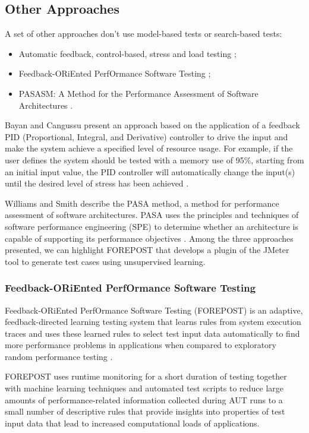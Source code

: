 \documentclass[espaco=umemeio,chapter=TITLE,twoside,openright]{abnt}
\begin{document}
\subsection{Other Approaches}

A set of other approaches don't use model-based tests or search-based tests:

\begin{itemize}
\item Automatic feedback, control-based, stress and load testing \cite{Bayan2008};
\item Feedback-ORiEnted PerfOrmance Software Testing \cite{Luo2015};
\item PASASM: A Method for the
Performance Assessment of Software Architectures \cite{Williams2002}.
\end{itemize}

Bayan and Cangussu present an approach based on the application of a feedback
PID (Proportional, Integral, and Derivative) controller to drive the input and make the system achieve a specified level of resource usage. For example, if the user defines the system should be tested with a memory use of 95\%, starting from an initial input value, the PID controller will automatically change the input(s) until the desired level of stress has been achieved \cite{Bayan2008}.

Williams and Smith describe the PASA method, a method for performance assessment of software architectures. PASA uses the principles and techniques of software performance engineering (SPE) to determine whether an architecture is capable of supporting its performance objectives  \cite{Williams2002}. Among the three approaches presented, we can highlight FOREPOST that develops a plugin of the JMeter tool to generate test cases using unsupervised learning.

\subsubsection{Feedback-ORiEnted PerfOrmance Software Testing}

Feedback-ORiEnted PerfOrmance Software Testing (FOREPOST) is an adaptive, feedback-directed learning testing system that learns rules from system execution traces and uses these learned rules to select test input data automatically to find more performance problems in applications when compared to exploratory random performance testing \cite{Grechanik2012}.

FOREPOST uses runtime monitoring for a short duration of testing together with machine learning techniques and automated test scripts to reduce large amounts of performance-related information collected during AUT runs to a small number of descriptive rules that provide insights into properties of test input data that lead to increased computational loads of applications.
\end{document}
